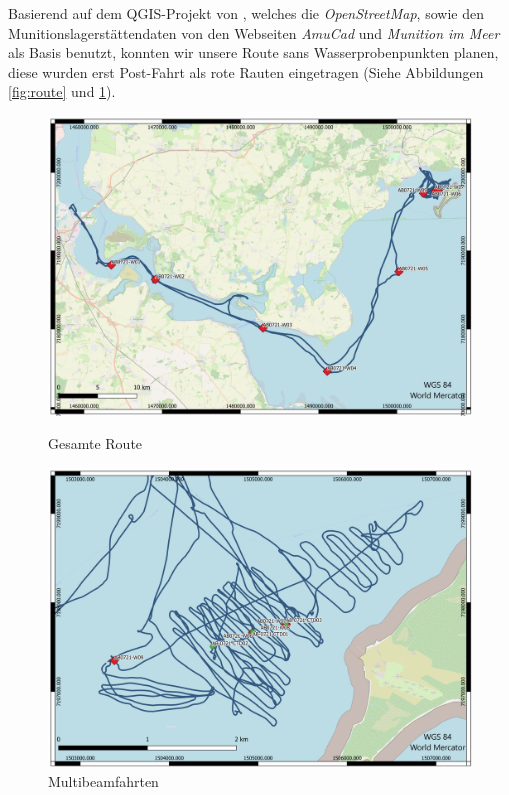 Basierend auf dem QGIS-Projekt von \jens, welches die \emph{OpenStreetMap}, sowie den Munitionslagerstättendaten von den Webseiten
\emph{AmuCad}\cite{amucad} und \emph{Munition im Meer}\cite{muninmeer}
als Basis benutzt, konnten wir unsere Route sans Wasserprobenpunkten planen, diese wurden erst Post-Fahrt als rote Rauten eingetragen (Siehe Abbildungen \ref{fig:route} und \ref{fig:multibeam_route}).
\begin{figure}[]
    \begin{minipage}{0.48\textwidth}
        \centering
        \includegraphics[width=1\linewidth]{Bilder/QGIS/Gesamte_route.png}
        \caption{Gesamte Route}
        \label{fig:route}
    \end{minipage}
    \begin{minipage}{0.48\textwidth}
        \centering
        \includegraphics[width=1\linewidth]{Bilder/QGIS/multibeam.png}
        \caption{Multibeamfahrten}
        \label{fig:multibeam_route}
    \end{minipage}
\end{figure}

